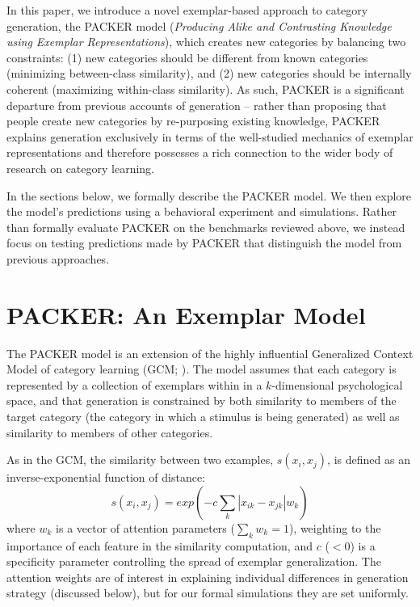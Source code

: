 \documentclass[10pt,letterpaper]{article}
\begin{document}
In this paper, we introduce a novel exemplar-based approach to category generation, the PACKER model (\textit{Producing Alike and Contrasting Knowledge using Exemplar Representations}), which creates new categories by balancing two constraints: (1) new categories should be different from known categories (minimizing between-class similarity), and (2) new categories should be internally coherent (maximizing within-class similarity). As such, PACKER is a significant departure from previous accounts of generation -- rather than proposing that people create new categories by re-purposing existing knowledge, PACKER explains generation exclusively in terms of the well-studied mechanics of exemplar representations and therefore possesses a rich connection to the wider body of research on category learning.

In the sections below, we formally describe the PACKER model. We then explore the model's predictions using a behavioral experiment and simulations. Rather than formally evaluate PACKER on the benchmarks reviewed above, we instead focus on testing predictions made by PACKER that distinguish the model from previous approaches.


\section{PACKER: An Exemplar Model}

The PACKER model is an extension of the highly influential Generalized Context Model of category learning (GCM; \citealp{nosofsky1984choice}). The model assumes that each category is represented by a collection of exemplars within in a $k$-dimensional psychological space, and that generation is constrained by both similarity to members of the target category (the category in which a stimulus is being generated) as well as similarity to members of other categories. 

As in the GCM, the similarity between two examples, $s(x_i, x_j)$, is defined as an inverse-exponential function of distance:
\begin{equation}
  s(x_i,x_j) = exp( -c \sum_{k}{|x_{ik} - x_{jk}|}w_k )
  \label{eq:similarity}
\end{equation}
where $w_k$ is a vector of attention parameters ($\sum_k{w_k} = 1$), weighting to the importance of each feature in the similarity computation, and $c$ ($<0$) is a specificity parameter controlling the spread of exemplar generalization. The attention weights are of interest in explaining individual differences in generation strategy (discussed below), but for our formal simulations they are set uniformly.
\end{document}
